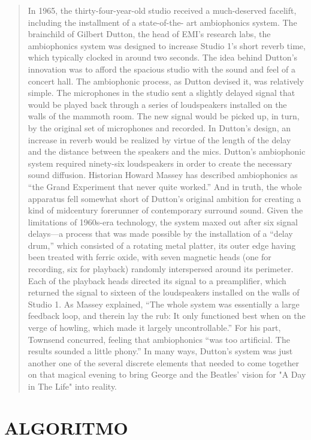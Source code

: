 \begin{quote}

In 1965, the thirty-four-year-old studio
received a much-deserved facelift, including the installment of a state-of-the-
art ambiophonics system. The brainchild of Gilbert Dutton, the head of EMI’s
research labs, the ambiophonics system was designed to increase Studio 1’s
short reverb time, which typically clocked in around two seconds. The idea
behind Dutton’s innovation was to afford the spacious studio with the sound and feel of a concert hall.
The ambiophonic process, as Dutton devised it, was relatively simple. The microphones in the studio sent a slightly delayed signal that would be played back through a series of loudspeakers installed on the walls of the mammoth room. The new signal would be picked up, in turn, by the original set of microphones and recorded. In Dutton’s design, an increase in reverb would be realized by virtue of the length of the delay and the distance between the speakers and the mics. Dutton’s ambiophonic system required ninety-six loudspeakers in order to create the necessary sound diffusion. Historian Howard Massey has described ambiophonics as “the Grand Experiment that never quite worked.” And in truth, the whole apparatus fell somewhat short of Dutton’s original ambition for creating a kind of midcentury forerunner of contemporary surround sound.
Given the limitations of 1960s-era technology, the system maxed out after six signal delays—a
process that was made possible by the installation of a “delay drum,” which
consisted of a rotating metal platter, its outer edge having been treated with
ferric oxide, with seven magnetic heads (one for recording, six for playback)
randomly interspersed around its perimeter. Each of the playback heads
directed its signal to a preamplifier, which returned the signal to sixteen of the
loudspeakers installed on the walls of Studio 1. As Massey explained, “The
whole system was essentially a large feedback loop, and therein lay the rub: It
only functioned best when on the verge of howling, which made it largely
uncontrollable.” For his part, Townsend concurred, feeling that ambiophonics
“was too artificial. The results sounded a little phony.” In many ways,
Dutton’s system was just another one of the several discrete elements that
needed to come together on that magical evening to bring George and the Beatles' vision for "A Day in The Life" into reality.

\end{quote}


\section*{ALGORITMO}

